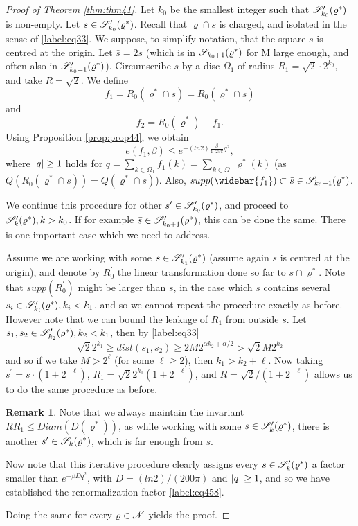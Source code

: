 \documentclass[11pt,reqno]{article}
\DeclarePairedDelimiter\abs{\lvert}{\rvert}%
\theoremstyle{definition}
\newtheorem*{remark}{Remark}
\numberwithin{equation}{section}
\begin{document}
\begin{proof}[Proof of Theorem \eqref{thm:thm41}]
Let $k_0$ be the smallest integer such that $\mathscr{S}^\prime_{k_0}(\varrho^*)$ is non-empty. Let $s\in \mathscr{S}^\prime_{k_0}(\varrho^*)$. Recall that $\varrho \cap s$ is charged, and isolated in the sense of \eqref{label:eq33}. We suppose, to simplify notation, that the square $s$ is centred at the origin. Let $\bar{s} = 2s$ (which is in $\mathscr{S}_{k_0+1}(\varrho^*)$ for M large enough, and often also in $\mathscr{S}^\prime_{k_0+1}(\varrho^*)$).
Circumscribe $s$ by a disc $\Omega_1$ of radius $R_1 = \sqrt{2} \cdot 2^{k_0}$, and take $R = \sqrt{2}$.
We define
$$
f_1 = R_0(\varrho^* \cap s) = R_0(\varrho^* \cap \bar{s})
$$
and
$$
f_2 = R_0(\varrho^*) - f_1.
$$
Using Proposition \eqref{prop:prop44}, we obtain
$$
e(f_1, \beta) \leq e^{-(ln2)\frac{\beta}{4\cdot 25\pi}q^2},
$$
where $\abs{q} \geq 1$ holds for $q = \sum_{k \in \Omega_1} f_1(k) = \sum_{k \in \Omega_1} \varrho^*(k)$ (as $Q(R_0(\varrho^* \cap s)) = Q(\varrho^* \cap s)$). Also, $supp(\widebar{f_1}) \subset \bar{s} \in \SqrsSetOf{k_0+1}{\varrho^*}$.

We continue this procedure for other $s^\prime \in \mathscr{S}^\prime_{k_0}(\varrho^*)$, and proceed to $\mathscr{S}^\prime_{k}(\varrho^*), k > k_0$. If for example $\bar{s} \in \mathscr{S}^\prime_{k_0+1}(\varrho^*)$, this can be done the same. There is one important case which we need to address. 

Assume we are working with some $s \in \mathscr{S}^\prime_{k_1}(\varrho^*)$ (assume again $s$ is centred at the origin), and denote by $R_0^\prime$ the linear transformation done so far to $s \cap \varrho^*$. Note that $supp(R_0^\prime)$ might be larger than $s$, in the case which $s$ contains several $s_i \in \mathscr{S}^\prime_{k_i}(\varrho^*), k_i<k_1$, and so we cannot repeat the procedure exactly as before. However note that we can bound the leakage of $R_1$ from outside $s$. Let $s_1, s_2 \in \mathscr{S}^\prime_{k_2}(\varrho^*), k_2<k_1$, then by \eqref{label:eq33}
$$
\sqrt{2} 2^{k_1} \geq dist(s_1, s_2) \geq 2M2^{\alpha k_2 + \alpha /2} > \sqrt{2} M 2^{k_2}
$$
and so if we take $M > 2^\ell$ (for some $\ell \geq 2$), then $k_1 > k_2 + \ell$. Now taking $s^\prime = s \cdot (1+2^{-\ell})$, $R_1 = \sqrt{2} 2^{k_1} (1+2^{-\ell})$, and $R = \sqrt{2}/(1+2^{-\ell})$ allows us to do the same procedure as before.

\begin{remark}
Note that we always maintain the invariant $RR_1 \leq Diam(D(\varrho^*))$, as while working with some $s \in \mathscr{S}^\prime_{k}(\varrho^*)$, there is another $s^\prime \in \mathscr{S}_{k}(\varrho^*)$, which is far enough from $s$.
\end{remark}

Now note that this iterative procedure clearly assigns every $s \in \mathscr{S}^\prime_{k}(\varrho^*)$ a factor smaller than $e^{-\beta D q^2}$, with $D = (ln2) / (200\pi)$ and $\abs{q} \geq 1$, and so we have established the renormalization factor \eqref{label:eq458}.

Doing the same for every $\varrho \in \mathscr{N}$ yields the proof.
\end{proof}
\end{document}
